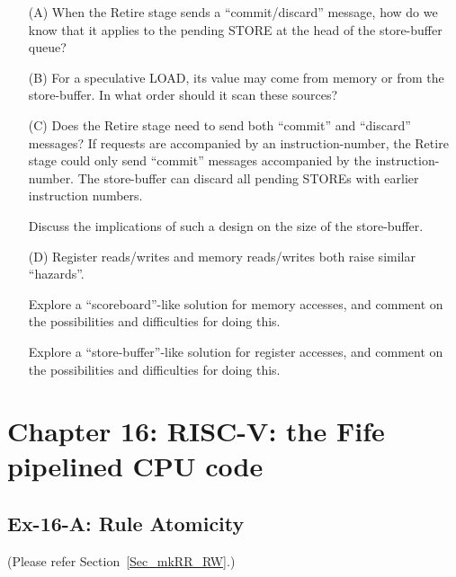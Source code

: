 \begin{itemize}

 \item[(A)] When the Retire stage sends a ``commit/discard'' message, how
       do we know that it applies to the pending STORE at the head of
       the store-buffer queue?

 \item[(B)] For a speculative LOAD, its value may come from memory or from
       the store-buffer.  In what order should it scan these sources?

 \item[(C)] Does the Retire stage need to send both ``commit'' and
       ``discard'' messages?  If requests are accompanied by an
       instruction-number, the Retire stage could only send ``commit''
       messages accompanied by the instruction-number.  The
       store-buffer can discard all pending STOREs with earlier
       instruction numbers.

       Discuss the implications of such a design on the size of the
       store-buffer.

 \item[(D)] Register reads/writes and memory reads/writes both raise
       similar ``hazards''.

       Explore a ``scoreboard''-like solution for memory accesses, and
       comment on the possibilities and difficulties for doing this.

       Explore a ``store-buffer''-like solution for register accesses,
       and comment on the possibilities and difficulties for doing
       this.

\end{itemize}


\hdivider

\section*{Chapter 16: RISC-V: the Fife pipelined CPU code}


\subsection*{Ex-16-A: Rule Atomicity}
\label{Ex-16-A-Register-Read-and-Dispatch}

(Please refer Section~\ref{Sec_mkRR_RW}.)

